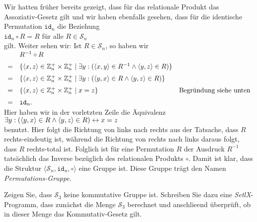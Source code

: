 \remark
Wir hatten fr\"{u}her bereits gezeigt, dass f\"{u}r das relationale Produkt das Assoziativ-Gesetz gilt und wir
haben ebenfalls gesehen, dass f\"{u}r die identische Permutation $\mathtt{id}_n$ die Beziehung
\\[0.2cm]
\hspace*{1.3cm}
$\mathtt{id}_n \circ R = R$ \quad f\"{u}r alle $R \in \mathcal{S}_n$
\\[0.2cm]
gilt.  Weiter sehen wir: Ist $R \in \mathcal{S}_n$, so haben wir
\\[0.2cm]
\hspace*{1.3cm}
$
\begin{array}[t]{cll}
   & R^{-1} \circ R \\[0.2cm]
 = & \{ \pair(x,z) \in \mathbb{Z}_n^+\times \mathbb{Z}_n^+ \mid \exists y: 
        (\pair(x,y) \in R^{-1} \wedge \pair(y,z) \in R )
     \} \\[0.2cm]
 = & \{ \pair(x,z) \in \mathbb{Z}_n^+ \times \mathbb{Z}_n^+ \mid 
        \exists y: (\pair(y,x) \in R \wedge \pair(y,z) \in R )
     \} 
   & \\[0.2cm]
 = & \{ \pair(x,z) \in \mathbb{Z}_n^+ \times \mathbb{Z}_n^+ \mid x = z \}
    & \mbox{Begr\"{u}ndung siehe unten}    \\[0.2cm]
 = & \mathtt{id}_n.
\end{array}
$
\\[0.2cm]
Hier haben wir in der vorletzten Zeile die \"{A}quivalenz
\\[0.2cm]
\hspace*{1.3cm}
$\exists y: (\pair(y,x) \in R \wedge \pair(y,z) \in R) \leftrightarrow x = z$
\\[0.2cm]
benutzt.  Hier folgt die Richtung von links nach rechts aus der Tatsache, dass $R$ rechts-eindeutig
ist, w\"{a}hrend die Richtung von rechts nach links daraus folgt, dass $R$ rechts-total ist.
Folglich ist f\"{u}r eine Permutation $R$ der Ausdruck $R^{-1}$ tats\"{a}chlich das Inverse bez\"{u}glich des
relationalen Produkts $\circ$.  Damit ist klar, dass die 
Struktur $\langle \mathcal{S}_n, \mathtt{id}_n, \circ \rangle$ eine Gruppe ist.
Diese Gruppe tr\"{a}gt den Namen \emph{Permutations-Gruppe}.
\eox
\vspace*{-0.2cm}

\exercise
Zeigen Sie, dass $\mathcal{S}_3$ keine kommutative Gruppe ist.  Schreiben Sie dazu eine \textsl{SetlX}-Programm,
dass zun\"{a}chst die Menge $\mathcal{S}_3$ berechnet und anschlie\3end \"{u}berpr\"{u}ft, ob in dieser Menge das
Kommutativ-Gesetz gilt.
\exend


